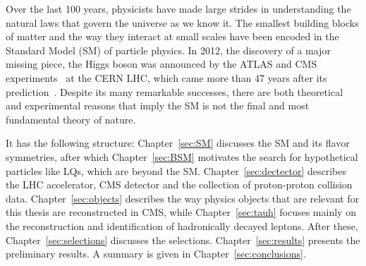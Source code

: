 
\label{sec:introduction}

Over the last 100 years, physicists have made large strides in understanding the natural laws that govern the universe as we know it. The smallest building blocks of matter and the way they interact at small scales have been encoded in the Standard Model (SM) of particle physics.
In 2012, the discovery of a major missing piece, the Higgs boson was announced by the ATLAS and CMS experiments~\cite{Higgs_discovery_2012_CMS,Higgs_discovery_2012_ATLAS,Higgs_discovery_2013_CMS} at the CERN LHC, which came more than 47 years after its prediction~\cite{Higgs_theory1,Higgs_theory2}.
Despite its many remarkable successes, there are both theoretical and experimental reasons that imply the SM is not the final and most fundamental theory of nature.

It has the following structure:
Chapter~\ref{sec:SM} discusses the SM and its flavor symmetries, after which Chapter~\ref{sec:BSM} motivates the search for hypothetical particles like LQs, which are beyond the SM.
Chapter~\ref{sec:dectector} describes the LHC accelerator, CMS detector and the collection of proton-proton collision data.
Chapter~\ref{sec:objects} describes the way physics objects that are relevant for this thesis are reconstructed in CMS,
while Chapter~\ref{sec:tauh} focuses mainly on the reconstruction and identification of hadronically decayed \PGt leptons.
After these, Chapter~\ref{sec:selections} discusses the selections.
Chapter~\ref{sec:results} presents the preliminary results.
A summary is given in Chapter~\ref{sec:conclusions}.
